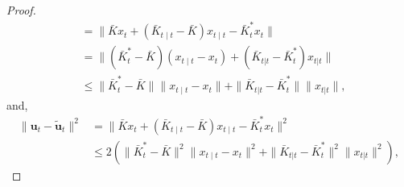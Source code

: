 \documentclass{article}
\newcommand{\contTilde}[1]{\mathbf{\tilde{#1}}}
\begin{document}
\begin{proof}
\begin{align*}
    &= \|\bar{K}x_{t} + (\bar{K}_{t\mid t}-\bar{K})x_{t\mid t} - \bar{K}_{t}^{*}x_{t}\|\\
    &= \|(\bar{K}_{t}^{*}-\bar{K})(x_{t\mid t}-x_{t})  + (\bar{K}_{t|t}-\bar{K}_{t}^{*})x_{t|t}\|\\
    &\leq \|\bar{K}_{t}^{*}-\bar{K}\|\|x_{t\mid t}-x_{t}\|  + \|\bar{K}_{t|t}-\bar{K}_{t}^{*}\| \|x_{t|t}\|,
\end{align*}
and,
\begin{align*}
    \|\mathbf{u}_{t} - \contTilde{u}_{t}\|^{2}
    &= \|\bar{K}x_{t} + (\bar{K}_{t\mid t}-\bar{K})x_{t\mid t} - \bar{K}_{t}^{*}x_{t}\|^{2}\\
    &\leq 2(\|\bar{K}_{t}^{*}-\bar{K}\|^{2}\|x_{t\mid t}-x_{t}\|^{2}  + \|\bar{K}_{t|t}-\bar{K}_{t}^{*}\|^{2} \|x_{t|t}\|^{2}),
\end{align*}


\end{proof}
\end{document}
